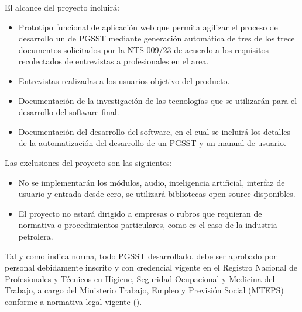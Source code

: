 \noindent
El alcance del proyecto incluirá:

\begin{itemize}
	\item Prototipo funcional de aplicación web que permita agilizar el proceso de desarrollo un de PGSST mediante generación automática de tres de los trece documentos solicitados por la NTS 009/23 de acuerdo a los requisitos recolectados de entrevistas a profesionales en el area.
	\item Entrevistas realizadas a los usuarios objetivo del producto.
	\item Documentación de la investigación de las tecnologías que se utilizarán para el
	desarrollo del software final.
	\item Documentación del desarrollo del software, en el cual se incluirá los detalles de la automatización del desarrollo de un PGSST y un manual de usuario.
\end{itemize}

\noindent
Las exclusiones del proyecto son las siguientes:
\begin{itemize}
	\item No se implementarán los módulos, audio, inteligencia artificial, interfaz de usuario y entrada desde cero, se utilizará bibliotecas open-source disponibles.
	\item El proyecto no estará dirigido a empresas o rubros que requieran de normativa o procedimientos particulares, como es el caso de la industria petrolera.
\end{itemize}

Tal y como indica norma, todo PGSST desarrollado, debe ser aprobado por personal debidamente inscrito y con credencial vigente en el Registro Nacional de Profesionales y Técnicos en Higiene, Seguridad Ocupacional y Medicina del Trabajo, a cargo del Ministerio Trabajo, Empleo y Previsión Social (MTEPS) conforme a normativa legal vigente (\cite{NTS-009/23}).
